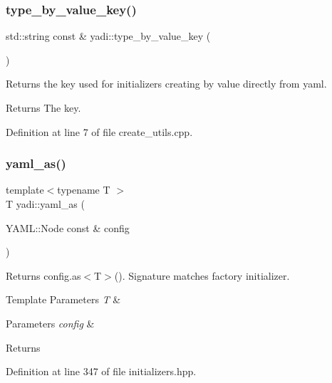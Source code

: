 \subsubsection{\texorpdfstring{type\+\_\+by\+\_\+value\+\_\+key()}{type\_by\_value\_key()}}
{\footnotesize\ttfamily std\+::string const  \& yadi\+::type\+\_\+by\+\_\+value\+\_\+key (\begin{DoxyParamCaption}{ }\end{DoxyParamCaption})}



Returns the key used for initializers creating by value directly from yaml. 

\begin{DoxyReturn}{Returns}
The key. 
\end{DoxyReturn}


Definition at line 7 of file create\+\_\+utils.\+cpp.

\mbox{\label{namespaceyadi_a8552ed4e9350993901558fb0db1e0906}} 
\subsubsection{\texorpdfstring{yaml\+\_\+as()}{yaml\_as()}}
{\footnotesize\ttfamily template$<$typename T $>$ \\
T yadi\+::yaml\+\_\+as (\begin{DoxyParamCaption}\item[{Y\+A\+M\+L\+::\+Node const \&}]{config }\end{DoxyParamCaption})}



Returns config.\+as$<$\+T$>$(). Signature matches factory initializer. 


\begin{DoxyTemplParams}{Template Parameters}
{\em T} & \\
\hline
\end{DoxyTemplParams}

\begin{DoxyParams}{Parameters}
{\em config} & \\
\hline
\end{DoxyParams}
\begin{DoxyReturn}{Returns}

\end{DoxyReturn}


Definition at line 347 of file initializers.\+hpp.

